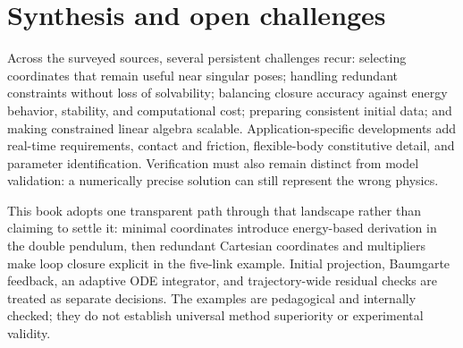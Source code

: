 \section*{Synthesis and open challenges}
Across the surveyed sources, several persistent challenges recur: selecting coordinates that remain useful near singular poses; handling redundant constraints without loss of solvability; balancing closure accuracy against energy behavior, stability, and computational cost; preparing consistent initial data; and making constrained linear algebra scalable. Application-specific developments add real-time requirements, contact and friction, flexible-body constitutive detail, and parameter identification. Verification must also remain distinct from model validation: a numerically precise solution can still represent the wrong physics.

This book adopts one transparent path through that landscape rather than claiming to settle it: minimal coordinates introduce energy-based derivation in the double pendulum, then redundant Cartesian coordinates and multipliers make loop closure explicit in the five-link example. Initial projection, Baumgarte feedback, an adaptive ODE integrator, and trajectory-wide residual checks are treated as separate decisions. The examples are pedagogical and internally checked; they do not establish universal method superiority or experimental validity.
